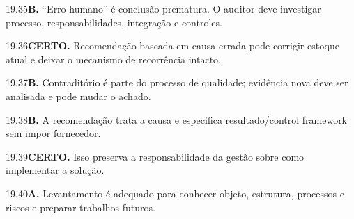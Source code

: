 \begin{solucao}{19.35}\textbf{B.} ``Erro humano'' é conclusão prematura. O auditor deve investigar processo, responsabilidades, integração e controles.\end{solucao}
\begin{solucao}{19.36}\textbf{CERTO.} Recomendação baseada em causa errada pode corrigir estoque atual e deixar o mecanismo de recorrência intacto.\end{solucao}
\begin{solucao}{19.37}\textbf{B.} Contraditório é parte do processo de qualidade; evidência nova deve ser analisada e pode mudar o achado.\end{solucao}
\begin{solucao}{19.38}\textbf{B.} A recomendação trata a causa e especifica resultado/control framework sem impor fornecedor.\end{solucao}
\begin{solucao}{19.39}\textbf{CERTO.} Isso preserva a responsabilidade da gestão sobre como implementar a solução.\end{solucao}
\begin{solucao}{19.40}\textbf{A.} Levantamento é adequado para conhecer objeto, estrutura, processos e riscos e preparar trabalhos futuros.\end{solucao}

